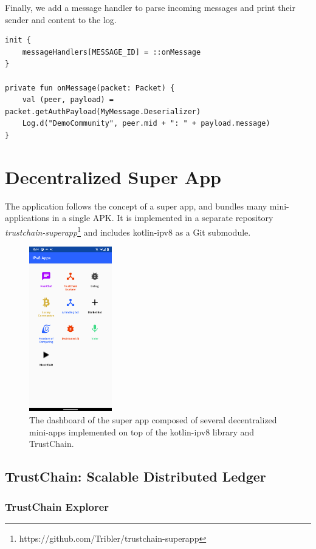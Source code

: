 Finally, we add a message handler to parse incoming messages and print their sender and content to the log.

\begin{verbatim}
init {
    messageHandlers[MESSAGE_ID] = ::onMessage
}

private fun onMessage(packet: Packet) {
    val (peer, payload) = packet.getAuthPayload(MyMessage.Deserializer)
    Log.d("DemoCommunity", peer.mid + ": " + payload.message)
}
\end{verbatim}


\chapter{Decentralized Super App}

The application follows the concept of a super app, and bundles many mini-applications in a single APK. It is implemented in a separate repository \textit{trustchain-superapp}\footnote{https://github.com/Tribler/trustchain-superapp} and includes kotlin-ipv8 as a Git submodule.

\begin{figure}
    \centering
    \includegraphics[width=0.32\textwidth]{screens/superapp/superapp}
    \caption{The dashboard of the super app composed of several decentralized mini-apps implemented on top of the kotlin-ipv8 library and TrustChain.}
    \label{manyverse}
\end{figure}

\section{TrustChain: Scalable Distributed Ledger}

\subsection{TrustChain Explorer}

